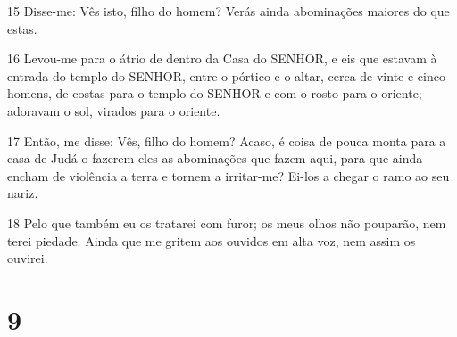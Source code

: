 \par 15 Disse-me: Vês isto, filho do homem? Verás ainda abominações maiores do que estas.
\par 16 Levou-me para o átrio de dentro da Casa do SENHOR, e eis que estavam à entrada do templo do SENHOR, entre o pórtico e o altar, cerca de vinte e cinco homens, de costas para o templo do SENHOR e com o rosto para o oriente; adoravam o sol, virados para o oriente.
\par 17 Então, me disse: Vês, filho do homem? Acaso, é coisa de pouca monta para a casa de Judá o fazerem eles as abominações que fazem aqui, para que ainda encham de violência a terra e tornem a irritar-me? Ei-los a chegar o ramo ao seu nariz.
\par 18 Pelo que também eu os tratarei com furor; os meus olhos não pouparão, nem terei piedade. Ainda que me gritem aos ouvidos em alta voz, nem assim os ouvirei.

\chapter{9}

